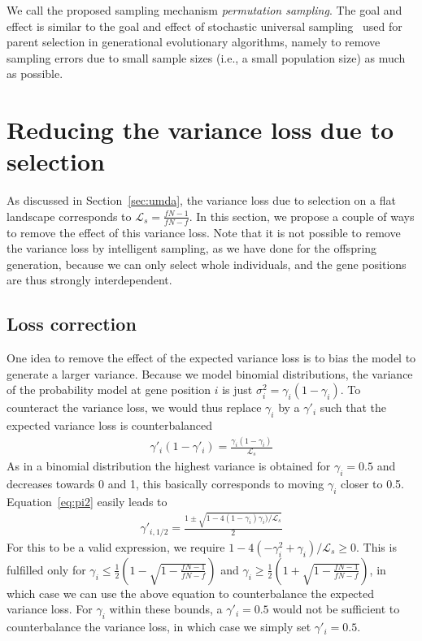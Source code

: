 \documentclass{acm_proc_article-sp}
\newcommand{\Np}{N}
\newcommand{\p}{\gamma}
\begin{document}
We call the proposed sampling mechanism {\em permutation sampling}.
The goal and effect is similar to the goal and effect of stochastic
universal sampling~\cite{Bak87} used for parent selection in generational
evolutionary algorithms, namely to remove sampling errors due to small sample sizes
(i.e., a small population size) as much as possible.

\section{Reducing the variance loss due to selection}
\label{sec:model}

As discussed in Section~\ref{sec:umda}, the variance loss due to
selection on a flat landscape corresponds to
$\mathcal{L}_s=\frac{f\Np-1}{f\Np-f}$.  In this section, we propose a
couple of ways to remove the effect of this variance loss.  Note that
it is not possible to remove the variance loss by intelligent
sampling, as we have done for the offspring generation, because we can
only select whole individuals, and the gene positions are thus
strongly interdependent.

\subsection{Loss correction}
\label{sec:correction}

One idea to remove the effect of the expected variance loss is to
bias the model to generate a larger variance. Because we model binomial distributions,
the variance of the probability
model at gene position $i$ is just $\sigma^2_i=\p_i(1-\p_i)$. To counteract the variance
loss, we would thus replace $\p_i$ by a $\p'_i$ such that the expected variance loss is
counterbalanced
\begin{eqnarray}
\p'_i(1-\p'_i) = \frac{\p_i(1-\p_i)}{ \mathcal{L}_s} \label{eq:pi2}
\end{eqnarray}
As in a binomial distribution the highest variance is obtained for $\p_i=0.5$ and
decreases towards 0 and 1,
this basically corresponds to moving $\p_i$ closer to 0.5.
Equation~\ref{eq:pi2} easily leads to
\begin{eqnarray}
\p'_{i,1/2}=\frac{1\pm\sqrt{1-4(1-\p_i)\p_i)/\mathcal{L}_s}}{2}
\end{eqnarray}
For this to be a valid expression, we require $1-4(-\p_i^2+\p_i)/\mathcal{L}_s\geq0$. This
is fulfilled only for $\p_i\leq \frac{1}{2}\left(1-\sqrt{1-\frac{f\Np-1}{f\Np-f}}\right)$ and
$\p_i\geq \frac{1}{2}\left(1+\sqrt{1-\frac{f\Np-1}{f\Np-f}}\right)$, in which case
we can use the above equation to counterbalance the expected variance loss.
For $\p_i$ within these bounds, a $\p'_i=0.5$ would not be sufficient to counterbalance
the variance loss, in which case we simply set $\p'_i=0.5$.
\end{document}
